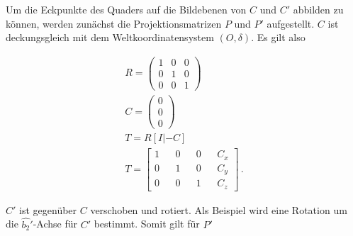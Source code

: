 
%
Um die Eckpunkte des Quaders auf die Bildebenen von $C$ und $C'$ abbilden zu können, werden zunächst die Projektionsmatrizen $P$ und $P'$ aufgestellt. $C$ ist deckungsgleich mit dem Weltkoordinatensystem $(O,\delta)$. Es gilt also

\begin{gather}
R=\begin{pmatrix}
1&0&0\\
0&1&0\\
0&0&1
\end{pmatrix}\\
C=\begin{pmatrix}
0\\0\\0
\end{pmatrix}\\
T = R[I|-C]\\
T = \begin{bmatrix}
1&&0&&0&&C_x\\
0&&1&&0&&C_y\\
0&&0&&1&&C_z
\end{bmatrix} \, .
\end{gather}

$C'$ ist gegenüber $C$ verschoben und rotiert. Als Beispiel wird eine Rotation um die $\hat{b_2}'$-Achse für $C'$ bestimmt. Somit gilt für $P'$






